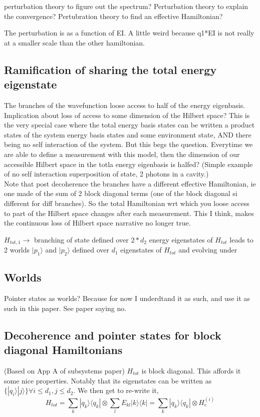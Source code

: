 \documentclass{article}
\begin{document}
perturbation theory to figure out the spectrum?
Perturbation theory to explain the convergence?
Pertubration theory to find an effective Hamiltonian?

The perturbation is as a function of EI.
A little weird because q1*EI is not really at a smaller scale than the other hamiltonian.

\subsection{Ramification of sharing the total energy eigenstate}
The branches of the wavefunction loose access to half of the energy eigenbasis. 
Implication about loss of access to some dimension of the Hilbert space? 
This is the very special case where the total energy basis states can be written a product states of the system energy basis states and some environment state, AND there being no self interaction of the system.
But this begs the question. Everytime we are able to define a measurement with this model, then the dimension of our accessible Hilbert space in the totla energy eigenbasis is halfed? (Simple example of no self interaction superposition of state, 2 photons in a cavity.) \\
Note that post decoherence the branches have a different effective Hamiltonian, ie one made of the sum of 2 block diagonal terms (one of the block diagonal si different for diff branches). So the total Hamiltonian wrt which you loose access to part of the Hilbert space changes after each measurement. This I think, makes the continuous loss of Hilbert space narrative no longer true. 

$H_{tot,1}\rightarrow$ branching of state defined over $2*d_2$ energy eigenstates of $H_{tot}$ leads to 2 worlds $|p_1\rangle$ and $|p_2\rangle$  defined over $d_1$ eigenstates of $H_{tot}$ and evolving under 


\subsection{Worlds}

Pointer states as worlds? Because for now I underdtand it as such, and use it as such in this paper.
See paper saying no.


\subsection{Decoherence and pointer states for block diagonal Hamiltonians}
(Based on App A of subsystems paper)
$H_{tot}$ is block diagonal. This affords it some nice properties. Notably that its eigenstates can be written as $\{|q_i\rangle|j\rangle\}\forall i\leq d_1,j\leq d_2$. We then get to re-write it,
\begin{equation}
    H_{tot}=\sum_k|q_k\rangle \langle q_k|\otimes\sum_lE_{kl}|k\rangle\langle k| = \sum_k|q_k\rangle \langle q_k|\otimes H^{(i)}_e
\end{equation}
\end{document}
